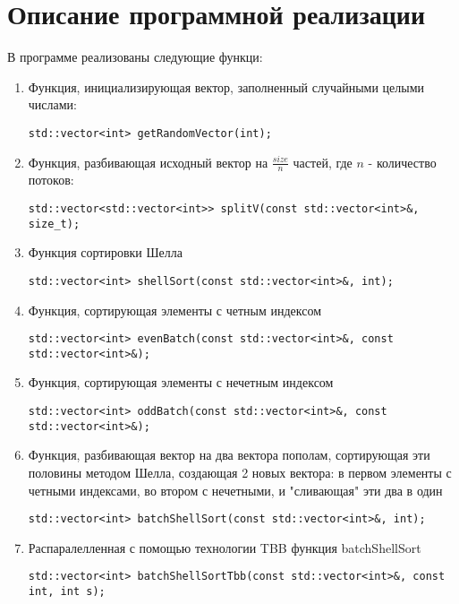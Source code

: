 \documentclass{report}
\begin{document}
\section*{Описание программной реализации}
В программе реализованы следующие функци:
\begin{enumerate}

\item Функция, инициализирующая вектор, заполненный случайными целыми числами:
\begin{lstlisting}
std::vector<int> getRandomVector(int);
\end{lstlisting}
\item Функция, разбивающая исходный вектор на $\frac{size}{n}$ частей, где $n$ - количество потоков:
\begin{lstlisting}
std::vector<std::vector<int>> splitV(const std::vector<int>&, size_t);
\end{lstlisting}
\item Функция сортировки Шелла
\begin{lstlisting}
std::vector<int> shellSort(const std::vector<int>&, int);
\end{lstlisting}
\item Функция, сортирующая элементы с четным индексом
\begin{lstlisting}
std::vector<int> evenBatch(const std::vector<int>&, const std::vector<int>&);
\end{lstlisting}
\item Функция, сортирующая элементы с нечетным индексом
\begin{lstlisting}
std::vector<int> oddBatch(const std::vector<int>&, const std::vector<int>&);
\end{lstlisting}
\item Функция, разбивающая вектор на два вектора пополам, сортирующая эти половины методом Шелла, создающая 2 новых вектора: в первом элементы с четными индексами, во втором с нечетными, и "сливающая" эти два в один
\begin{lstlisting}
std::vector<int> batchShellSort(const std::vector<int>&, int);	
\end{lstlisting}
\item Распаралелленная с помощью технологии TBB функция batchShellSort
\begin{lstlisting}
std::vector<int> batchShellSortTbb(const std::vector<int>&, const int, int s);
\end{lstlisting}

\end{enumerate}
\end{document}
